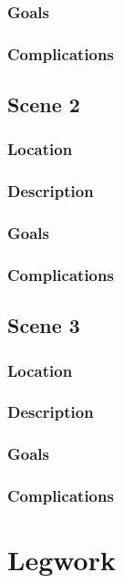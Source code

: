 \documentclass{ShadowTeXSR5}
\begin{document}
\subsubsection{Goals}
\lipsum[1]
\subsubsection{Complications}
\lipsum[1]

\subsection{Scene 2}
\lipsum[1]
\subsubsection{Location}
\lipsum[1]
\subsubsection{Description}
\lipsum[1]
\subsubsection{Goals}
\lipsum[1]
\subsubsection{Complications}
\lipsum[1]

\subsection{Scene 3}
\lipsum[1]
\subsubsection{Location}
\lipsum[1]
\subsubsection{Description}
\lipsum[1]
\subsubsection{Goals}
\lipsum[1]
\subsubsection{Complications}
\lipsum[1]

\section{Legwork}
\lipsum[1]
\end{document}
